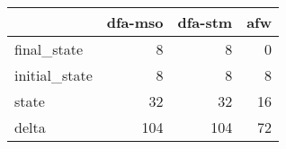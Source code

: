 \begin{tabular}{lrrr}
\toprule
{} &  dfa-mso &  dfa-stm &  afw \\
\midrule
final\_state   &        8 &        8 &    0 \\
initial\_state &        8 &        8 &    8 \\
state         &       32 &       32 &   16 \\
delta         &      104 &      104 &   72 \\
\bottomrule
\end{tabular}
